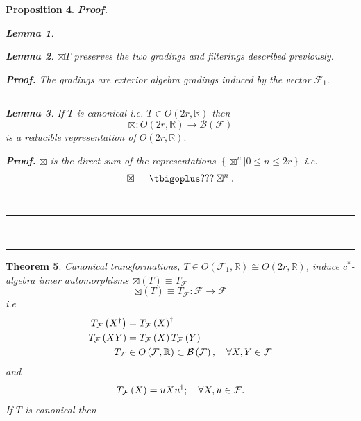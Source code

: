 \documentclass[aps, preprint]{revtex4}
\newtheorem{theorem}{Theorem}
\newtheorem{lemma}[theorem]{Lemma}
\newtheorem{proposition}[theorem]{Proposition}
\newenvironment{proof}[1][Proof]{\noindent\textbf{#1.} }{\ \rule{0.5em}{0.5em}}
\begin{document}
\begin{proposition}
\begin{proof}
\begin{lemma}
\end{lemma}


\begin{lemma}
$ \boxtimes T$ preserves the two gradings and filterings described previously. 


\begin{proof}
The gradings are exterior algebra gradings induced by the vector $\mathcal{F}_{1}\text{.}$ 
\end{proof}


\end{lemma}


\begin{lemma}
If $T$ is canonical i.e. $T \in O \left (2 r ,\mathbb{R}\right )$ then
\begin{equation} \boxtimes  :O \left (2 r ,\mathbb{R}\right ) \rightarrow \mathcal{B} \left (\mathcal{F}\right )
\end{equation}is a reducible representation of $O \left (2 r ,\mathbb{R}\right )\text{.}$ 


\begin{proof}
$ \boxtimes $ is the direct sum of the representations $\left \{\left . \boxtimes ^{n}\right \vert 0 \leq n \leq 2 r\right \}$ i.e.
\begin{equation} \boxtimes \, =\tbigoplus ??? \boxtimes ^{n}\text{.}
\end{equation}
\end{proof}


\end{lemma}


\end{proof}


\end{proposition}


\begin{theorem}
Canonical transformations, $T \in O \left (\mathcal{F}_{1} ,\mathbb{R}\right ) \cong O \left (2 r ,\mathbb{R}\right )$, induce $c^{ \ast }$-algebra inner automorphisms $ \boxtimes \left (T\right ) \equiv T_{\mathcal{F}}$
\begin{equation} \boxtimes \left (T\right ) \equiv T_{\mathcal{F}} :\mathcal{F} \rightarrow \mathcal{F}
\end{equation}i.e
\begin{align}T_{\mathcal{F}} \left (X^{ \dag }\right ) &  =T_{\mathcal{F}} \left (X\right )^{ \dag } \\
T_{\mathcal{F}} \left (X Y\right ) &  =T_{\mathcal{F}} \left (X\right ) T_{\mathcal{F}} \left (Y\right ) \\
T_{\mathcal{F}} &  \in O \left (\mathcal{F} ,\mathbb{R}\right ) \subset \mathcal{B} \left (\mathcal{F}\right ) ,\text{\quad } \forall X ,Y \in \mathcal{F}\end{align}and
\begin{equation}T_{\mathcal{F}} \left (X\right ) =u X u^{ \dag } ;\text{\quad } \forall X ,u \in \mathcal{F}\text{.}
\end{equation}If $T$ is canonical then 
\end{theorem}
\end{document}
